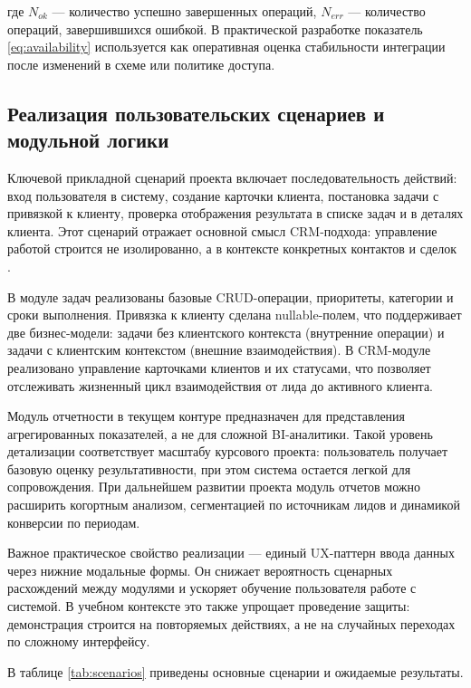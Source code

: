 где $N_{ok}$ --- количество успешно завершенных операций, $N_{err}$ --- количество операций, завершившихся ошибкой. В практической разработке показатель \eqref{eq:availability} используется как оперативная оценка стабильности интеграции после изменений в схеме или политике доступа.

\subsection{Реализация пользовательских сценариев и модульной логики}

Ключевой прикладной сценарий проекта включает последовательность действий: вход пользователя в систему, создание карточки клиента, постановка задачи с привязкой к клиенту, проверка отображения результата в списке задач и в деталях клиента. Этот сценарий отражает основной смысл CRM-подхода: управление работой строится не изолированно, а в контексте конкретных контактов и сделок \cite{repoReadme,docsDefenseScript}.

В модуле задач реализованы базовые CRUD-операции, приоритеты, категории и сроки выполнения. Привязка к клиенту сделана nullable-полем, что поддерживает две бизнес-модели: задачи без клиентского контекста (внутренние операции) и задачи с клиентским контекстом (внешние взаимодействия). В CRM-модуле реализовано управление карточками клиентов и их статусами, что позволяет отслеживать жизненный цикл взаимодействия от лида до активного клиента.

Модуль отчетности в текущем контуре предназначен для представления агрегированных показателей, а не для сложной BI-аналитики. Такой уровень детализации соответствует масштабу курсового проекта: пользователь получает базовую оценку результативности, при этом система остается легкой для сопровождения. При дальнейшем развитии проекта модуль отчетов можно расширить когортным анализом, сегментацией по источникам лидов и динамикой конверсии по периодам.

Важное практическое свойство реализации --- единый UX-паттерн ввода данных через нижние модальные формы. Он снижает вероятность сценарных расхождений между модулями и ускоряет обучение пользователя работе с системой. В учебном контексте это также упрощает проведение защиты: демонстрация строится на повторяемых действиях, а не на случайных переходах по сложному интерфейсу.

В таблице \ref{tab:scenarios} приведены основные сценарии и ожидаемые результаты.

